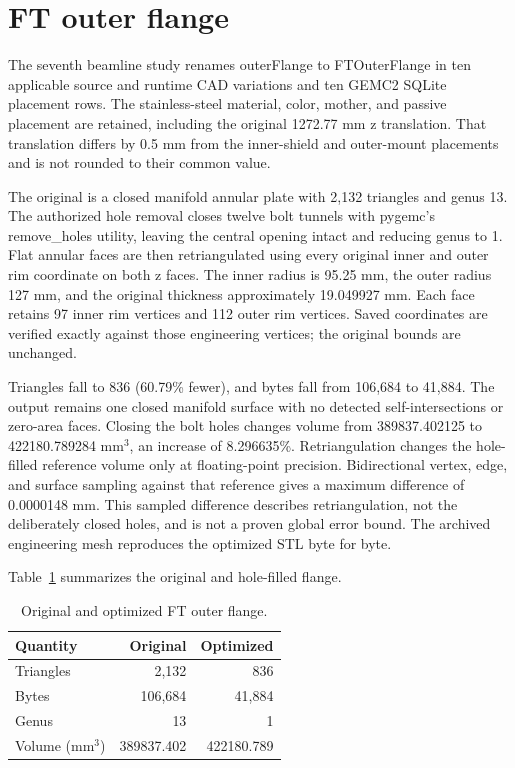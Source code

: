 \FloatBarrier
\section{FT outer flange}

The seventh beamline study renames outerFlange to FTOuterFlange in ten applicable source and runtime CAD
variations and ten GEMC2 SQLite placement rows. The stainless-steel material, color, mother, and passive
placement are retained, including the original 1272.77 mm z translation. That translation differs by 0.5 mm
from the inner-shield and outer-mount placements and is not rounded to their common value.

The original is a closed manifold annular plate with 2,132 triangles and genus 13. The authorized hole
removal closes twelve bolt tunnels with pygemc's remove\_holes utility, leaving the central opening intact
and reducing genus to 1. Flat annular faces are then retriangulated using every original inner and outer rim
coordinate on both z faces. The inner radius is 95.25 mm, the outer radius 127 mm, and the original
thickness approximately 19.049927 mm. Each face retains 97 inner rim vertices and 112 outer rim vertices.
Saved coordinates are verified exactly against those engineering vertices; the original bounds are
unchanged.

Triangles fall to 836 (60.79\% fewer), and bytes fall from 106,684 to 41,884. The output remains one closed
manifold surface with no detected self-intersections or zero-area faces. Closing the bolt holes changes
volume from 389837.402125 to 422180.789284 mm$^3$, an increase of 8.296635\%. Retriangulation changes the
hole-filled reference volume only at floating-point precision. Bidirectional vertex, edge, and surface
sampling against that reference gives a maximum difference of 0.0000148 mm. This sampled difference
describes retriangulation, not the deliberately closed holes, and is not a proven global error bound. The
archived engineering mesh reproduces the optimized STL byte for byte.

Table~\ref{tab:outer-flange-mesh} summarizes the original and hole-filled flange.

\begin{table}[htbp]
\centering
\caption{Original and optimized FT outer flange.}
\label{tab:outer-flange-mesh}
\begin{tabular}{lrr}
\toprule
Quantity & Original & Optimized \\
\midrule
Triangles & 2,132 & 836 \\
Bytes & 106,684 & 41,884 \\
Genus & 13 & 1 \\
Volume (mm$^3$) & 389837.402 & 422180.789 \\
\bottomrule
\end{tabular}
\end{table}

